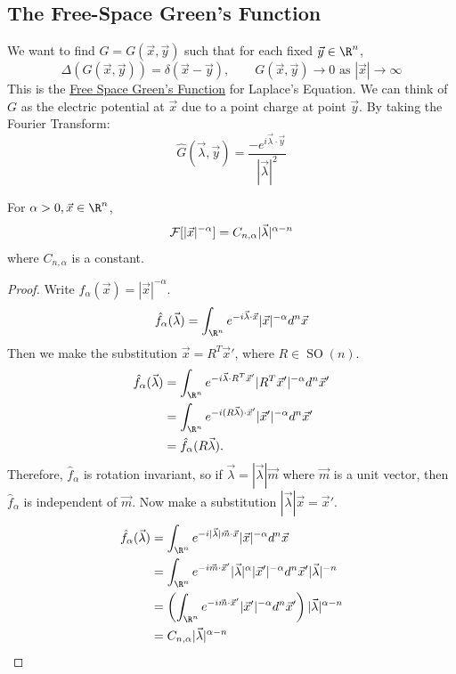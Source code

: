 \documentclass[../Main.tex]{subfiles}
\begin{document}
\subsection{The Free-Space Green's Function}
We want to find $G = G(\vec{x}, \vec{y})$ such that for each fixed $\vec{y} \in \R^n$,
\begin{equation*}
    \Delta(G(\vec{x}, \vec{y})) = \delta(\vec{x} - \vec{y}),\qquad G(\vec{x}, \vec{y}) \to 0 \text{ as } |\vec{x}| \to\infty
\end{equation*}
This is the \underline{Free Space Green's Function} for Laplace's Equation. We can think of $G$ as the electric potential at $\vec{x}$ due to a point charge at point $\vec{y}$. By taking the Fourier Transform:
\begin{equation*}
    \hat{G}(\vec{\lambda}, \vec{y}) = \frac{-e^{i \vec{\lambda} \cdot \vec{y}}}{|\vec{\lambda}|^2}
\end{equation*}
\begin{proposition}
    For $\alpha > 0, \vec{x} \in \R^n$,
    \begin{equation*}
        \mathcal{F}[|\vec{x}|^{-\alpha}] = C_{n, \alpha} |\vec{\lambda}|^{\alpha - n}
    \end{equation*}
    where $C_{n, \alpha}$ is a constant.
    \label{propFTOfModX}
\end{proposition}
\begin{proof}
    Write $f_\alpha(\vec{x}) = |\vec{x}|^{-\alpha}$.
    \begin{equation*}
        \hat{f}_\alpha(\vec{\lambda}) = \int_{\R^n} e^{-i \vec{\lambda} \cdot \vec{x}} |\vec{x}|^{-\alpha} d^n\vec{x}
    \end{equation*}
    Then we make the substitution $\vec{x} = R^T\vec{x}'$, where $R \in \operatorname{SO}(n)$.
    \begin{align*}
        \hat{f}_\alpha(\vec{\lambda}) &= \int_{\R^n} e^{-i \vec{\lambda} \cdot R^T\vec{x}'}|R^T \vec{x}'|^{-\alpha} d^n \vec{x}' \\
        &= \int_{\R^n} e^{-i (R\vec{\lambda}) \cdot \vec{x}'}|\vec{x}'|^{-\alpha} d^n \vec{x}' \\
        &= \hat{f}_\alpha(R\vec{\lambda}).
    \end{align*}
    Therefore, $\hat{f}_\alpha$ is rotation invariant, so if $\vec{\lambda} = |\vec{\lambda}|\vec{m}$ where $\vec{m}$ is a unit vector, then $\hat{f}_\alpha$ is independent of $\vec{m}$.
    Now make a substitution $|\vec{\lambda}|\vec{x} = \vec{x}'$.
    \begin{align*}
        \hat{f}_\alpha(\vec{\lambda}) &= \int_{\R^n} e^{-i |\vec{\lambda}| \vec{m} \cdot \vec{x}} |\vec{x}|^{-\alpha} d^n \vec{x} \\
        &= \int_{\R^n} e^{-i \vec{m} \cdot \vec{x}'} |\vec{\lambda}|^\alpha|\vec{x}'|^{-\alpha} d^n \vec{x}' |\vec{\lambda}|^{-n} \\
        &= \left(\int_{\R^n} e^{-i \vec{m} \cdot \vec{x}'} |\vec{x}'|^{-\alpha} d^n \vec{x}'\right) |\vec{\lambda}|^{\alpha - n} \\
        &= C_{n, \alpha} |\vec{\lambda}|^{\alpha - n}
    \end{align*}
\end{proof}
\end{document}

